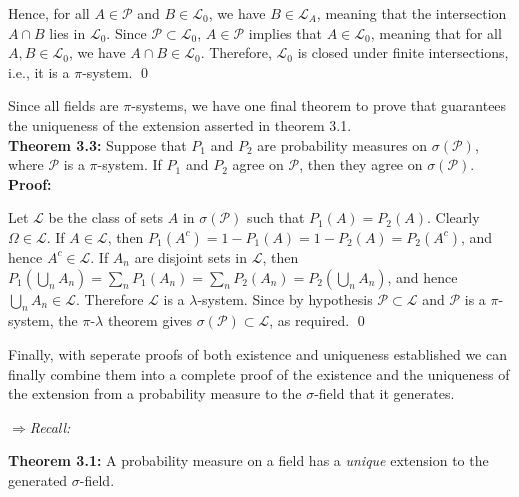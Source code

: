 \begin{proofline}
        Hence, for all $A \in \mathcal{P}$ and $B \in \mathcal{L}_0$, we have $B \in \mathcal{L}_A$, meaning that the intersection $A \cap B$ lies in $\mathcal{L}_0$.  Since $\mathcal{P} \subset \mathcal{L}_0$, $A \in \mathcal{P}$ implies that $A \in \mathcal{L}_0$, meaning that for all $A, B \in \mathcal{L}_0$, we have $A \cap B \in \mathcal{L}_0$. Therefore, $\mathcal{L}_0$ is closed under finite intersections, i.e., it is a $\pi$-system. \hfill \qed
    \end{proofline}

    \vspace{-1ex}
    Since all fields are $\pi$-systems, we have one final theorem to prove that guarantees the uniqueness of the extension asserted in theorem 3.1.\\[5pt]

    \textbf{Theorem 3.3: }Suppose that $P_1$ and $P_2$ are probability measures on $\sigma(\mathcal{P})$, where $\mathcal{P}$ is a $\pi$-system. If $P_1$ and $P_2$ agree on $\mathcal{P}$, then they agree on $\sigma(\mathcal{P})$.\\[-5pt]
    
    \textbf{Proof: }
    \vspace{-1ex}
    \begin{proofline}
        Let $\mathcal{L}$ be the class of sets $A$ in $\sigma(\mathcal{P})$ such that $P_1(A) = P_2(A)$. Clearly $\Omega \in \mathcal{L}$. If $A \in \mathcal{L}$, then $P_1(A^c) = 1 - P_1(A) = 1 - P_2(A) = P_2(A^c)$, and hence $A^c \in \mathcal{L}$. If $A_n$ are disjoint sets in $\mathcal{L}$, then $P_1(\bigcup_n A_n) = \sum_n P_1(A_n) = \sum_n P_2(A_n) = P_2(\bigcup_n A_n)$, and hence $\bigcup_n A_n \in \mathcal{L}$. Therefore $\mathcal{L}$ is a $\lambda$-system. Since by hypothesis $\mathcal{P} \subset \mathcal{L}$ and $\mathcal{P}$ is a $\pi$-system, the $\pi$-$\lambda$ theorem gives $\sigma(\mathcal{P}) \subset \mathcal{L}$, as required. \hfill \qed
    \end{proofline}

    Finally, with seperate proofs of both existence and uniqueness established we can finally combine them into a complete proof of the existence and the uniqueness of the extension from a probability measure to the $\sigma$-field that it generates.
    
    $\Rightarrow$\textit{Recall:}
    \vspace{-0.75ex}
    \begin{mdframed}
    \textbf{Theorem 3.1: } A probability measure on a field has a \textit{unique} extension to the generated $\sigma$-field.
    \end{mdframed}

